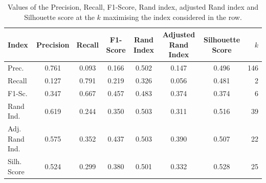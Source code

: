 \documentclass[a4paper]{article}
\begin{document}
	\begin{table}[h!]
		\centering
		\begin{tabular}{l*{6}{c}r}
			Index              & Precision & Recall & F1-Score & Rand Index & Adjusted Rand Index  & Silhouette Score & $k$ \\
			\hline
			Prec. 		& 0.761 & 0.093 & 0.166 & 0.502 & 0.147 & 0.496 & 146  \\
			Recall          & 0.127 & 0.791 & 0.219 & 0.326 &  0.056 & 0.481 &  2  \\
			F1-Sc.        & 0.347 & 0.667 & 0.457 & 0.483 &  0.374 & 0.374 &  6  \\
			Rand Ind.      & 0.619 & 0.244 & 0.350 & 0.503 &  0.311 & 0.516 &  39  \\
			Adj. Rand Ind. & 0.575 & 0.352 & 0.437 & 0.503 &  0.390 & 0.507 &  22  \\
			Silh. Score & 0.524 & 0.299 & 0.380 & 0.501 &  0.332 & 0.528 &  25  \\
		\end{tabular}
	\caption{Values of the Precision, Recall, F1-Score, Rand index, adjusted Rand index and Silhouette score at the $k$ maximising the index considered in the row.}
	\label{table:kmeans}
	\end{table}
\end{document}
